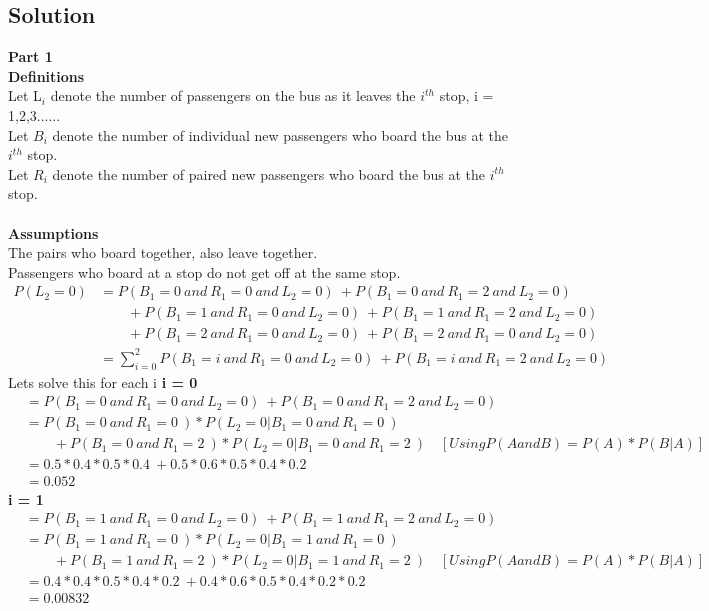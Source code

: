 \documentclass[12pt]{article}
\begin{document}
\subsection*{Solution}
\textbf{Part 1 }\\
\textbf{Definitions}\\
Let L$_i$ denote the number of passengers on the bus as it leaves the $i^{th}$ stop, i = 1,2,3......\\
Let $B_i$ denote the number of individual new passengers who board the bus at the $i^{th}$ stop.\\
Let $R_i$ denote the number of paired new passengers who board the bus at the $i^{th}$ stop.\\\\
\textbf{Assumptions}\\
The pairs who board together, also leave together.\\
Passengers who board at a stop do not get off at the same stop.\\
\begin{align}
P(L_2=0) & = P(B_1=0\ and\ R_1=0\ and\ L_2= 0)\ +  P(B_1=0\ and\ R_1=2\ and\ L_2= 0)\  \nonumber \\
  & \qquad + P(B_1=1\ and\ R_1=0\ and\ L_2= 0)\ + P(B_1=1\ and\ R_1=2\ and\ L_2= 0)\  \nonumber \\
  & \qquad + P(B_1=2\ and\ R_1=0\ and\ L_2= 0)\ + P(B_1=2\ and\ R_1=0\ and\ L_2= 0)\  \nonumber \\
  & = \sum_{i=0}^{2} P(B_1=i\ and\ R_1=0\ and\ L_2= 0)\ +  P(B_1=i\ and\ R_1=2\ and\ L_2= 0) \nonumber
\end{align}
Lets solve this for each i
\newpage
\textbf{i = 0 }\\
\begin{align}
 & = P(B_1=0\ and\ R_1=0\ and\ L_2= 0)\ +  P(B_1=0\ and\ R_1=2\ and\ L_2= 0)   \nonumber \\
 & = P(B_1=0\ and\ R_1=0\ ) * P(L_2=0 |B_1=0\ and\ R_1=0\ )    \nonumber \\
 & \qquad + P(B_1=0\ and\ R_1=2\ ) * P(L_2=0 |B_1=0\ and\ R_1=2\ )\quad [Using  P(A and B) = P(A) * P(B|A)] \nonumber \\
 & = 0.5 * 0.4*0.5*0.4\ + 0.5*0.6*0.5*0.4*0.2 \nonumber\\
 & = 0.052 \nonumber
\end{align}
\textbf{i = 1 }\\
\begin{align}
 & = P(B_1=1\ and\ R_1=0\ and\ L_2= 0)\ +  P(B_1=1\ and\ R_1=2\ and\ L_2= 0)   \nonumber \\
 & = P(B_1=1\ and\ R_1=0\ ) * P(L_2=0 |B_1=1\ and\ R_1=0\ )    \nonumber \\
 & \qquad + P(B_1=1\ and\ R_1=2\ ) * P(L_2=0 |B_1=1\ and\ R_1=2\ )\quad [Using  P(A and B) = P(A) * P(B|A)] \nonumber \\
 & = 0.4 * 0.4 * 0.5*0.4*0.2\ + 0.4*0.6*0.5*0.4*0.2*0.2 \nonumber\\
 & = 0.00832 \nonumber
\end{align}
\end{document}
